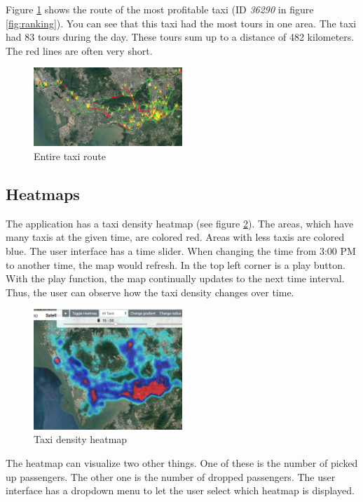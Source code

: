 \documentclass[10pt]{sig-alternate}
\begin{document}
Figure \ref{fig:best_taxi} shows the route of the most profitable taxi (ID \textit{36290} in figure \ref{fig:ranking}). You can see that this taxi had the most tours in one area. The taxi had 83 tours during the day. These tours sum up to a distance of 482 kilometers. The red lines are often very short.

\begin{figure}[ht]
\centering
\includegraphics[width=0.5\textwidth]{img/best_taxi.png}
\caption{Entire taxi route}
\label{fig:best_taxi}
\end{figure}

\subsection{Heatmaps}
\label{sec:heatmaps}

The application has a taxi density heatmap (see figure \ref{fig:density}). The areas, which have many taxis at the given time, are colored red. Areas with less taxis are colored blue. The user interface has a time slider. When changing the time from 3:00 PM to another time, the map would refresh. In the top left corner is a play button. With the play function, the map continually updates to the next time interval. Thus, the user can observe how the taxi density changes over time.

\begin{figure}[ht]
\centering
\includegraphics[width=0.5\textwidth]{img/density.png}
\caption{Taxi density heatmap}
\label{fig:density}
\end{figure}

The heatmap can visualize two other things. One of these is the number of picked up passengers. The other one is the number of dropped passengers. The user interface has a dropdown menu to let the user select which heatmap is displayed.
\end{document}
